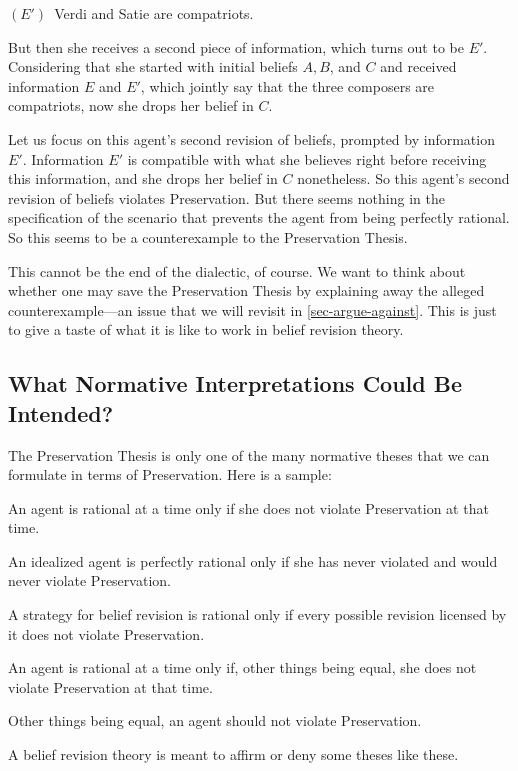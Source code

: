 	\xm $(E')$\, Verdi and Satie are compatriots.

\ed But then she receives a second piece of information, which turns out to be $E'$. Considering that she started with initial beliefs $A, B$, and $C$ and received information $E$ and $E'$, which jointly say that the three composers are compatriots, now she drops her belief in $C$. 

\ed Let us focus on this agent's second revision of beliefs, prompted by information $E'$. Information $E'$ is compatible with what she believes right before receiving this information, and she drops her belief in $C$ nonetheless. So this agent's second revision of beliefs violates Preservation. But there seems nothing in the specification of the scenario that prevents the agent from being perfectly rational. So this seems to be a counterexample to the Preservation Thesis.

This cannot be the end of the dialectic, of course. We want to think about whether one may save the Preservation Thesis by explaining away the alleged counterexample---an issue that we will revisit in \autoref{sec-argue-against}. This is just to give a taste of what it is like to work in belief revision theory.



\subsection{What Normative Interpretations Could Be Intended?}\label{sec-interpretations}

The Preservation Thesis is only one of the many normative theses that we can formulate in terms of Preservation. Here is a sample:\op

	\xm\op
	\im[($T_1$)] An agent is rational at a time only if she does not violate Preservation at that time.

	\im[($T_2$)] An idealized agent is perfectly rational only if she has never violated and would never violate Preservation.

	\im[($T_3$)] A strategy for belief revision is rational only if every possible revision licensed by it does not violate Preservation. 

	\im[($T_4$)] An agent is rational at a time only if, other things being equal, she does not violate Preservation at that time.

	\im[($T_5$)] Other things being equal, an agent should not violate Preservation.
	\ed

\ed A belief revision theory is meant to affirm or deny some theses like these.


